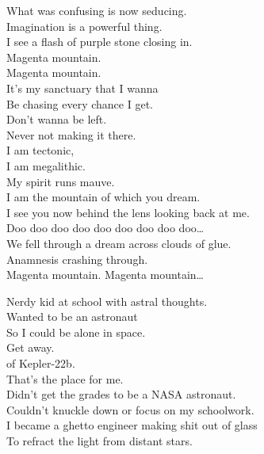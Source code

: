 What was confusing is now seducing. \\
Imagination is a powerful thing. \\
I see a flash of purple stone closing in. \\

Magenta mountain. \\
Magenta mountain. \\
It's my sanctuary that I wanna \\
Be chasing every chance I get. \\
Don't wanna be left. \\
Never not making it there. \\

I am tectonic, \\
I am megalithic. \\
My spirit runs mauve. \\
I am the mountain of which you dream. \\
I see you now behind the lens looking back at me. \\

Doo doo doo doo doo doo doo doo doo… \\
We fell through a dream across clouds of glue. \\
Anamnesis crashing through. \\

Magenta mountain. Magenta mountain… \\





Nerdy kid at school with astral thoughts. \\
Wanted to be an astronaut \\
So I could be alone in space. \\

Get away. \\
 of Kepler-22b. \\
That's the place for me. \\

Didn't get the grades to be a NASA astronaut. \\
Couldn't knuckle down or focus on my schoolwork. \\
I became a ghetto engineer making shit out of glass \\
To refract the light from distant stars. \\

